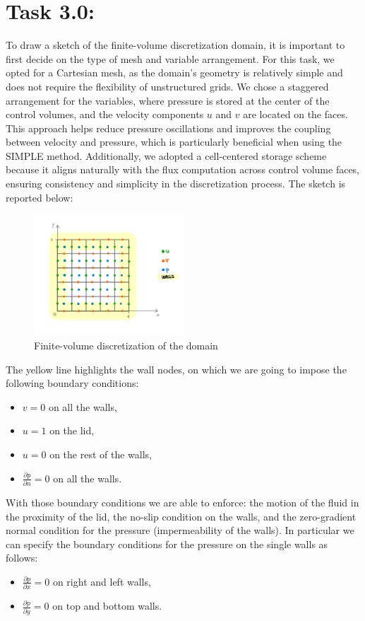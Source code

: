 \documentclass{article}
\begin{document}
\section*{\Large Task 3.0:}
To draw a sketch of the finite-volume discretization domain, it is important to first decide on the type of mesh and variable arrangement. For this task, we opted for a Cartesian mesh, as the domain's geometry is relatively simple and does not require the flexibility of unstructured grids. We chose a staggered arrangement for the variables, where pressure is stored at the center of the control volumes, and the velocity components $u$ and $v$ are located on the faces. This approach helps reduce pressure oscillations and improves the coupling between velocity and pressure, which is particularly beneficial when using the SIMPLE method. Additionally, we adopted a cell-centered storage scheme because it aligns naturally with the flux computation across control volume faces, ensuring consistency and simplicity in the discretization process.
The sketch is reported below:
\begin{figure}[h!]
  \centering
  \includegraphics[width=0.5\textwidth]{discretization.jpg}
  \caption{Finite-volume discretization of the domain}
\end{figure}
The yellow line highlights the wall nodes, on which we are going to impose the following boundary conditions:
\begin{itemize}
    \item $v = 0$ on all the walls,
    \item $u = 1$ on the lid,
    \item $u = 0$ on the rest of the walls,
    \item $\frac{\partial p}{\partial n} = 0$ on all the walls.
\end{itemize}
With those boundary conditions we are able to enforce: the motion of the fluid in the proximity of the lid, the no-slip condition on the walls, and the zero-gradient normal condition for the pressure (impermeability of the walls).
In particular we can specify the boundary conditions for the pressure on the single walls as follows:
\begin{itemize}
    \item $\frac{\partial p}{\partial x} = 0$ on right and left walls,
    \item $\frac{\partial p}{\partial y} = 0$ on top and bottom walls.
\end{itemize}
\end{document}
